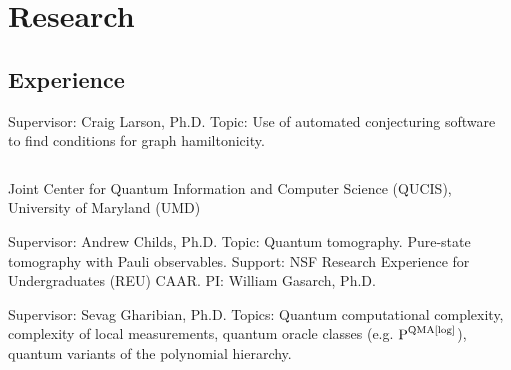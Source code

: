 \documentclass[11pt,letterpaper]{moderncv}
\begin{document}
\section{Research}
\subsection{Experience}
{	
	\begin{adjustwidth}{.25in}{}
		Supervisor: Craig Larson, Ph.D. \newline
		Topic: Use of automated conjecturing software to find conditions for graph hamiltonicity.
	\end{adjustwidth}
}

{
	$\!$\begin{minipage}{0.8\textwidth}
		Joint Center for Quantum Information and Computer Science (QUCIS), \newline
		University of Maryland (UMD)	
	\end{minipage}
}
{}{}
{	
	\begin{adjustwidth}{.25in}{}
		Supervisor: Andrew Childs, Ph.D. \newline
		Topic: Quantum tomography. Pure-state tomography with Pauli observables. \newline
		Support: NSF Research Experience for Undergraduates (REU)  CAAR. PI: William Gasarch, Ph.D.
	\end{adjustwidth}
}

{	
	\begin{adjustwidth}{.25in}{}
		Supervisor: Sevag Gharibian, Ph.D. \newline
		Topics: Quantum computational complexity, complexity of local measurements, quantum oracle classes (e.g. $\textup{P}^{\textup{QMA}[\log]}$), quantum variants of the polynomial hierarchy.
	\end{adjustwidth}
}



%
\end{document}
